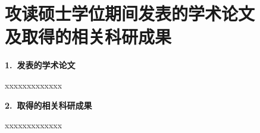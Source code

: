
\chapter[攻读硕士学位期间发表的学术论文及取得的相关科研成果]
{攻读硕士学位期间发表的学术论文\\及取得的相关科研成果}

{%
\noindent\songti\xiaosi\textbf{1.\ 发表的学术论文} 

\noindent xxxxxxxxxxxxx

\noindent \textbf{2.\ 取得的相关科研成果}

\noindent xxxxxxxxxxxxx
}